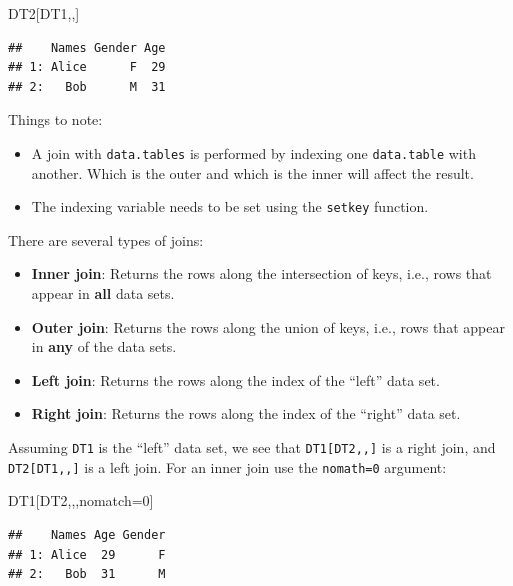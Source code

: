 \documentclass[]{book}
\newenvironment{Shaded}{\begin{snugshade}}{\end{snugshade}}
\newcommand{\DecValTok}[1]{\textcolor[rgb]{0.00,0.00,0.81}{#1}}
\newcommand{\NormalTok}[1]{#1}
\providecommand{\tightlist}{%
  \setlength{\itemsep}{0pt}\setlength{\parskip}{0pt}}
\theoremstyle{definition}
\theoremstyle{definition}
\theoremstyle{definition}
\theoremstyle{remark}
\begin{document}
\begin{Shaded}
\begin{Highlighting}[]
\NormalTok{DT2[DT1,,] }
\end{Highlighting}
\end{Shaded}

\begin{verbatim}
##    Names Gender Age
## 1: Alice      F  29
## 2:   Bob      M  31
\end{verbatim}

Things to note:

\begin{itemize}
\tightlist
\item
  A join with \texttt{data.tables} is performed by indexing one
  \texttt{data.table} with another. Which is the outer and which is the
  inner will affect the result.
\item
  The indexing variable needs to be set using the \texttt{setkey}
  function.
\end{itemize}

There are several types of joins:

\begin{itemize}
\tightlist
\item
  \textbf{Inner join}: Returns the rows along the intersection of keys,
  i.e., rows that appear in \textbf{all} data sets.
\item
  \textbf{Outer join}: Returns the rows along the union of keys, i.e.,
  rows that appear in \textbf{any} of the data sets.
\item
  \textbf{Left join}: Returns the rows along the index of the ``left''
  data set.
\item
  \textbf{Right join}: Returns the rows along the index of the ``right''
  data set.
\end{itemize}

Assuming \texttt{DT1} is the ``left'' data set, we see that
\texttt{DT1{[}DT2,,{]}} is a right join, and \texttt{DT2{[}DT1,,{]}} is
a left join. For an inner join use the \texttt{nomath=0} argument:

\begin{Shaded}
\begin{Highlighting}[]
\NormalTok{DT1[DT2,,,nomatch=}\DecValTok{0}\NormalTok{]}
\end{Highlighting}
\end{Shaded}

\begin{verbatim}
##    Names Age Gender
## 1: Alice  29      F
## 2:   Bob  31      M
\end{verbatim}
\end{document}
